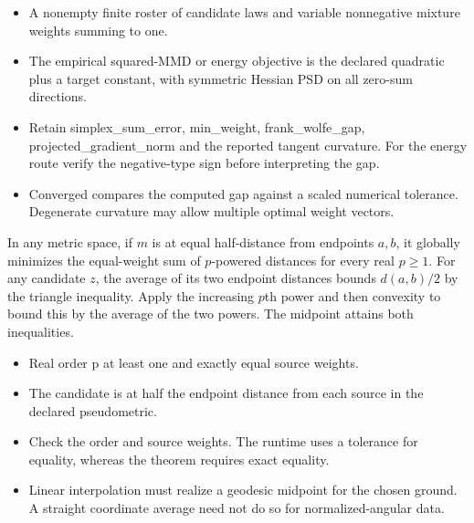 \expandafter\def\csname statadic@assumptions@STATADIC-BARYCENTRE-003\endcsname{\begin{itemize}
\item A nonempty finite roster of candidate laws and variable nonnegative mixture weights summing to one.
\item The empirical squared-MMD or energy objective is the declared quadratic plus a target constant, with symmetric Hessian PSD on all zero-sum directions.
\end{itemize}}
\expandafter\def\csname statadic@diagnostics@STATADIC-BARYCENTRE-003\endcsname{\begin{itemize}
\item Retain simplex\_sum\_error, min\_weight, frank\_wolfe\_gap, projected\_gradient\_norm and the reported tangent curvature. For the energy route verify the negative-type sign before interpreting the gap.
\item Converged compares the computed gap against a scaled numerical tolerance. Degenerate curvature may allow multiple optimal weight vectors.
\end{itemize}}
\expandafter\def\csname statadic@statement@STATADIC-BARYCENTRE-004\endcsname{In any metric space, if $m$ is at equal half-distance from
  endpoints $a,b$, it globally minimizes the equal-weight sum of $p$-powered
  distances for every real $p\ge1$.}
\expandafter\def\csname statadic@proof@STATADIC-BARYCENTRE-004\endcsname{For any candidate $z$, the average of its two endpoint distances
  bounds $d(a,b)/2$ by the triangle inequality. Apply the increasing $p$th power
  and then convexity to bound this by the average of the two powers.
  The midpoint attains both inequalities.}
\expandafter\def\csname statadic@assumptions@STATADIC-BARYCENTRE-004\endcsname{\begin{itemize}
\item Real order p at least one and exactly equal source weights.
\item The candidate is at half the endpoint distance from each source in the declared pseudometric.
\end{itemize}}
\expandafter\def\csname statadic@diagnostics@STATADIC-BARYCENTRE-004\endcsname{\begin{itemize}
\item Check the order and source weights. The runtime uses a tolerance for equality, whereas the theorem requires exact equality.
\item Linear interpolation must realize a geodesic midpoint for the chosen ground. A straight coordinate average need not do so for normalized-angular data.
\end{itemize}}
